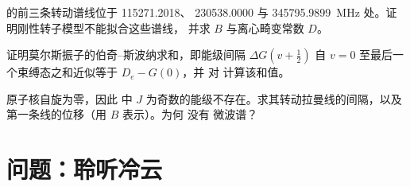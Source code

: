\begin{exercise}[$\star\star\star$]\label{exo:b3:rovibrational-spectroscopy:10}
 的前三条转动谱线位于 115271.2018、
230538.0000 与 \qty{345795.9899}{MHz} 处。证明刚性转子模型不能拟合这些谱线，
并求 $B$ 与离心畸变常数 $D$。
\end{exercise}

\begin{exercise}[$\star\star\star$]\label{exo:b3:rovibrational-spectroscopy:11}
证明莫尔斯振子的伯奇–斯波纳求和，即能级间隔 $\Delta G(v + \frac12)$ 自 $v = 0$
至最后一个束缚态之和近似等于 $D_e - G(0)$，并
对  计算该和值。
\end{exercise}

\begin{exercise}[$\star\star\star$]\label{exo:b3:rovibrational-spectroscopy:12}
 原子核自旋为零，因此  中
$J$ 为奇数的能级不存在。求其转动拉曼线的间隔，以及
第一条线的位移（用 $B$ 表示）。为何  没有
微波谱？
\end{exercise}

\section{问题：聆听冷云}

